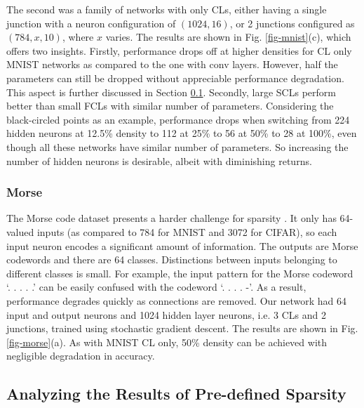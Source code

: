 \documentclass[conference]{IEEEtran}
\begin{document}
The second was a family of networks with only CLs, either having a single junction with a neuron configuration of $(1024,16)$, or 2 junctions configured as $(784,x,10)$, where $x$ varies. The results are shown in Fig. \ref{fig-mnist}(c), which offers two insights. Firstly, performance drops off at higher densities for CL only MNIST networks as compared to the one with conv layers. However, half the parameters can still be dropped without appreciable performance degradation. This aspect is further discussed in Section \ref{anares}. Secondly, large SCLs perform better than small FCLs with similar number of parameters. Considering the black-circled points as an example, performance drops when switching from 224 hidden neurons at 12.5\% density to 112 at 25\% to 56 at 50\% to 28 at 100\%, even though all these networks have similar number of parameters. So increasing the number of hidden neurons is desirable, albeit with diminishing returns. %

\subsubsection{Morse}\label{anares-morse}
The Morse code dataset presents a harder challenge for sparsity \cite{Dey2017_morseblog}. It only has 64-valued inputs (as compared to 784 for MNIST and 3072 for CIFAR), so each input neuron encodes a significant amount of information. The outputs are Morse codewords and there are 64 classes. Distinctions between inputs belonging to different classes is small. For example, the input pattern for the Morse codeword `. . . . .' can be easily confused with the codeword `. . . . -'. As a result, performance degrades quickly as connections are removed. Our network had 64 input and output neurons and 1024 hidden layer neurons, i.e. 3 CLs and 2 junctions, trained using stochastic gradient descent. The results are shown in Fig. \ref{fig-morse}(a). As with MNIST CL only, 50\% density can be achieved with negligible degradation in accuracy. %

\subsection{Analyzing the Results of Pre-defined Sparsity}\label{anares}
\end{document}
